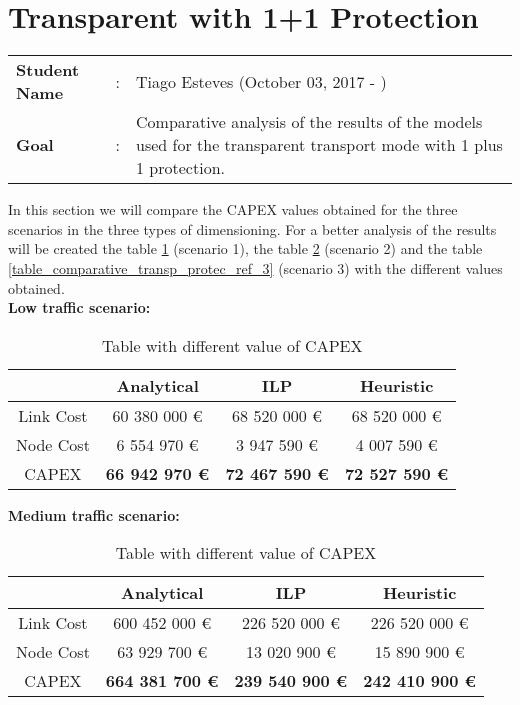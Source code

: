 \clearpage

\section{Transparent with 1+1 Protection}\label{comparative_Transp_Protection}
\begin{tcolorbox}	
\begin{tabular}{p{2.75cm} p{0.2cm} p{10.5cm}} 	
\textbf{Student Name}  &:& Tiago Esteves    (October 03, 2017 - )\\
\textbf{Goal}          &:& Comparative analysis of the results of the models used for the transparent transport mode with 1 plus 1 protection.
\end{tabular}
\end{tcolorbox}
\vspace{11pt}


In this section we will compare the CAPEX values obtained for the three scenarios in the three types of dimensioning. For a better analysis of the results will be created the table \ref{table_comparative_transp_protec_ref_1} (scenario 1), the table \ref{table_comparative_transp_protec_ref_2} (scenario 2) and the table \ref{table_comparative_transp_protec_ref_3} (scenario 3) with the different values obtained.\\

\textbf{Low traffic scenario:}

\begin{table}[h!]
\centering
\begin{tabular}{| c | c | c | c |}
 \hline
   & Analytical & ILP & Heuristic \\
 \hline\hline
 Link Cost & 60 380 000 \euro & 68 520 000 \euro & 68 520 000 \euro \\
 Node Cost & 6 554 970 \euro & 3 947 590 \euro & 4 007 590 \euro \\
 CAPEX & \textbf{66 942 970 \euro} & \textbf{72 467 590 \euro} & \textbf{72 527 590 \euro} \\
 \hline
\end{tabular}
\caption{Table with different value of CAPEX }
\label{table_comparative_transp_protec_ref_1}
\end{table}


\vspace{11pt}
\textbf{Medium traffic scenario:}

\begin{table}[h!]
\centering
\begin{tabular}{| c | c | c | c |}
 \hline
   & Analytical & ILP & Heuristic \\
 \hline\hline
 Link Cost & 600 452 000 \euro & 226 520 000 \euro & 226 520 000 \euro \\
 Node Cost & 63 929 700 \euro & 13 020 900 \euro & 15 890 900 \euro \\
 CAPEX & \textbf{664 381 700 \euro} & \textbf{239 540 900 \euro*} & \textbf{242 410 900 \euro} \\
 \hline
\end{tabular}
\caption{Table with different value of CAPEX }
\label{table_comparative_transp_protec_ref_2}
\end{table}


